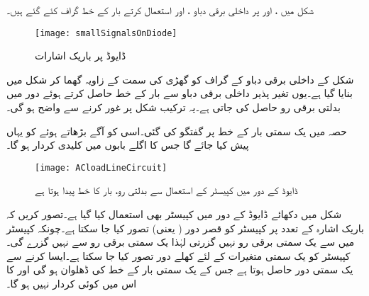 شکل   میں ،    اور    پر داخلی برقی دباو ،  اور  استعمال کرتے بار کے خط گراف کئے گئے ہیں۔
\begin{figure}
\centering
\texttt{[image: smallSignalsOnDiode]}
\caption{ ڈایوڈ پر باریک اشارات}
\label{شکل_ڈایوڈ_پر_باریک_اشارات}
\end{figure}

شکل  کے داخلی برقی دباو کے گراف کو گھڑی کی سمت    کے زاویہ گھما کر شکل   میں بنایا گیا ہے۔یوں تغیر پذیر داخلی برقی دباو سے بار کے خط حاصل کرتے ہوئے دور میں بدلتی برقی رو حاصل کی جاتی ہے۔یہ  ترکیب شکل پر غور کرنے سے واضح ہو گی۔


حصہ   میں یک سمتی بار کے خط پر گفتگو کی گئی۔اسی کو آگے بڑھاتے ہوئے   کو یہاں پیش کیا جائے گا جس کا اگلے بابوں میں کلیدی کردار ہو گا۔
\begin{figure}
\centering
\texttt{[image: ACloadLineCircuit]}
\caption{ڈایوڈ کے دور میں کپیسٹر کے استعمال سے بدلتی رو، بار کا خط پیدا ہوتا ہے}
\label{شکل_ڈایوڈ_بدلتے_بار_کا_دور}
\end{figure}
شکل   میں دکھائے ڈایوڈ کے دور میں کپیسٹر بھی استعمال کیا گیا ہے۔تصور کریں کہ باریک اشارہ  کے تعدد پر کپیسٹر کو قصر دور ( یعنی) تصور کیا جا سکتا ہے۔چونکہ کپیسٹر میں سے یک سمتی برقی رو نہیں گزرتی لہٰذا یک سمتی برقی رو   سے نہیں گزرے گی۔کپیسٹر کو یک سمتی متغیرات کے لئے کھلے دور تصور کیا جا سکتا ہے۔ایسا کرنے سے یک سمتی دور حاصل ہوتا ہے جس کے  یک سمتی بار کے خط کی ڈھلوان  ہو گی اور   کا اس میں کوئی کردار نہیں ہو گا۔

